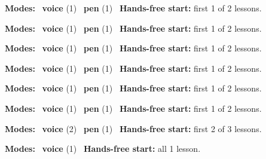 \expandafter\def\csname hlchaptermodality14\endcsname{%
  {\small\noindent
    \textbf{Modes:} \hlvoicesign{}~\textbf{voice} (1) \quad \hlpensign{}~\textbf{pen} (1)\quad
    \hlvoicesign{}~\textbf{Hands-free start:} first 1 of 2 lessons.%
    \par}\medskip
}

\expandafter\def\csname hlchaptermodality15\endcsname{%
  {\small\noindent
    \textbf{Modes:} \hlvoicesign{}~\textbf{voice} (1) \quad \hlpensign{}~\textbf{pen} (1)\quad
    \hlvoicesign{}~\textbf{Hands-free start:} first 1 of 2 lessons.%
    \par}\medskip
}

\expandafter\def\csname hlchaptermodality16\endcsname{%
  {\small\noindent
    \textbf{Modes:} \hlvoicesign{}~\textbf{voice} (1) \quad \hlpensign{}~\textbf{pen} (1)\quad
    \hlvoicesign{}~\textbf{Hands-free start:} first 1 of 2 lessons.%
    \par}\medskip
}

\expandafter\def\csname hlchaptermodality17\endcsname{%
  {\small\noindent
    \textbf{Modes:} \hlvoicesign{}~\textbf{voice} (1) \quad \hlpensign{}~\textbf{pen} (1)\quad
    \hlvoicesign{}~\textbf{Hands-free start:} first 1 of 2 lessons.%
    \par}\medskip
}

\expandafter\def\csname hlchaptermodality18\endcsname{%
  {\small\noindent
    \textbf{Modes:} \hlvoicesign{}~\textbf{voice} (1) \quad \hlpensign{}~\textbf{pen} (1)\quad
    \hlvoicesign{}~\textbf{Hands-free start:} first 1 of 2 lessons.%
    \par}\medskip
}

\expandafter\def\csname hlchaptermodality19\endcsname{%
  {\small\noindent
    \textbf{Modes:} \hlvoicesign{}~\textbf{voice} (1) \quad \hlpensign{}~\textbf{pen} (1)\quad
    \hlvoicesign{}~\textbf{Hands-free start:} first 1 of 2 lessons.%
    \par}\medskip
}

\expandafter\def\csname hlchaptermodality20\endcsname{%
  {\small\noindent
    \textbf{Modes:} \hlvoicesign{}~\textbf{voice} (2) \quad \hlpensign{}~\textbf{pen} (1)\quad
    \hlvoicesign{}~\textbf{Hands-free start:} first 2 of 3 lessons.%
    \par}\medskip
}

\expandafter\def\csname hlchaptermodality21\endcsname{%
  {\small\noindent
    \textbf{Modes:} \hlvoicesign{}~\textbf{voice} (1)\quad
    \hlvoicesign{}~\textbf{Hands-free start:} all 1 lesson.%
    \par}\medskip
}

